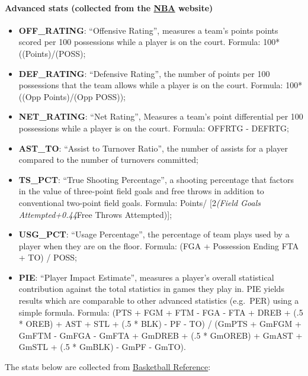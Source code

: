 \documentclass[
]{article}
\providecommand{\tightlist}{%
  \setlength{\itemsep}{0pt}\setlength{\parskip}{0pt}}
\begin{document}
\hypertarget{advanced-stats-collected-from-the-nba-website}{%
\paragraph{\texorpdfstring{Advanced stats (collected from the
\href{https://www.nba.com/?47}{NBA}
website)}{Advanced stats (collected from the NBA website)}}\label{advanced-stats-collected-from-the-nba-website}}

\begin{itemize}
\tightlist
\item
  \textbf{OFF\_RATING}: ``Offensive Rating'', measures a team's points
  points scored per 100 possessions while a player is on the court.
  Formula: 100*((Points)/(POSS);
\item
  \textbf{DEF\_RATING}: ``Defensive Rating'', the number of points per
  100 possessions that the team allows while a player is on the court.
  Formula: 100*((Opp Points)/(Opp POSS));
\item
  \textbf{NET\_RATING}: ``Net Rating'', Measures a team's point
  differential per 100 possessions while a player is on the court.
  Formula: OFFRTG - DEFRTG;
\item
  \textbf{AST\_TO}: ``Assist to Turnover Ratio'', the number of assists
  for a player compared to the number of turnovers committed;
\item
  \textbf{TS\_PCT}: ``True Shooting Percentage'', a shooting percentage
  that factors in the value of three-point field goals and free throws
  in addition to conventional two-point field goals. Formula: Points/
  {[}2\emph{(Field Goals Attempted+0.44}Free Throws Attempted){]};
\item
  \textbf{USG\_PCT}: ``Usage Percentage'', the percentage of team plays
  used by a player when they are on the floor. Formula: (FGA +
  Possession Ending FTA + TO) / POSS;
\item
  \textbf{PIE}: ``Player Impact Estimate'', measures a player's overall
  statistical contribution against the total statistics in games they
  play in. PIE yields results which are comparable to other advanced
  statistics (e.g.~PER) using a simple formula. Formula: (PTS + FGM +
  FTM - FGA - FTA + DREB + (.5 * OREB) + AST + STL + (.5 * BLK) - PF -
  TO) / (GmPTS + GmFGM + GmFTM - GmFGA - GmFTA + GmDREB + (.5 * GmOREB)
  + GmAST + GmSTL + (.5 * GmBLK) - GmPF - GmTO).
\end{itemize}

The stats below are collected from
\href{https://www.basketball-reference.com}{Basketball Reference}:
\end{document}
